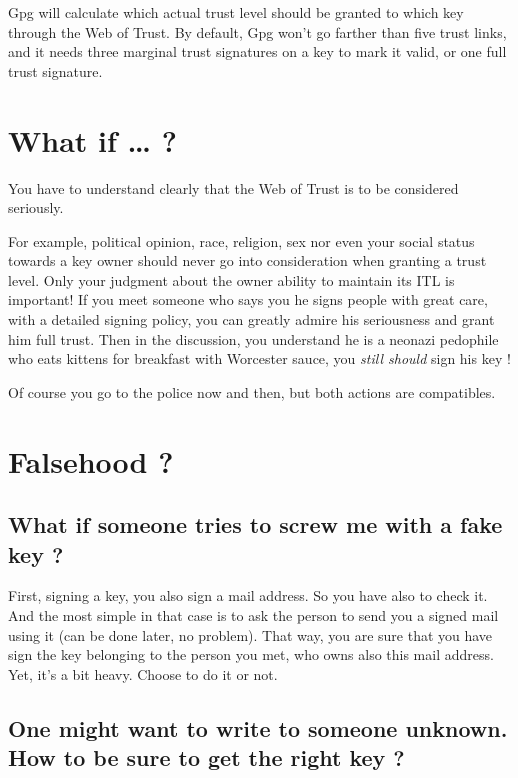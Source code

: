 Gpg will calculate which actual trust level should be granted to which key through the Web of Trust. By default, Gpg won't go farther than five trust links, and it needs three marginal trust signatures on a key to mark it valid, or one full
trust signature.

\section{What if \ldots{} ?}\label{what-if}

You have to understand clearly that the Web of Trust is to be considered seriously.

For example, political opinion, race, religion, sex nor even your social status towards a key owner should never go into consideration when
granting a trust level. Only your judgment about the owner ability to maintain its ITL is important! If you meet someone who says you he signs people with great care, with a detailed signing policy, you can greatly admire his seriousness and grant him full trust. Then in the discussion, you understand he is a neonazi pedophile who eats kittens for breakfast with Worcester sauce, you \emph{still should} sign his key !

Of course you go to the police now and then, but both actions are compatibles.

\section{Falsehood ?}\label{falsehood}

\subsection{What if someone tries to screw me with a fake key ?}\label{what-if-someone-tries-to-screw-me-with-a-fake-key}

First, signing a key, you also sign a mail address. So you have also to check it. And the most simple in that case is to ask the person to send you a signed mail using it (can be done later, no problem). That way, you are sure that you have sign the key belonging to the person you met, who owns also this mail address. Yet, it's a bit heavy. Choose to do it or not.

\subsection{One might want to write to someone unknown. How to be sure to get the right key ?}\label{one-might-want-to-write-to-someone-unknown.-how-to-be-sure-to-get-the-right-key}

